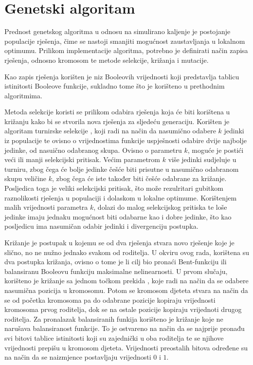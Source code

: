 \section{Genetski algoritam}
Prednost genetskog algoritma u odnosu na simulirano kaljenje je postojanje populacije rješenja, čime se nastoji smanjiti mogućnost zaustavljanja u lokalnom optimumu.
Prilikom implementacije algoritma, potrebno je definirati način zapisa rješenja, odnosno kromosom te metode selekcije, križanja i mutacije.

Kao zapis rješenja korišten je niz Booleovih vrijednosti koji predstavlja tablicu istinitosti Booleove funkcije, sukladno tome što je korišteno u prethodnim algoritmima. 

Metoda selekcije koristi se prilikom odabira rješenja koja će biti korištena u križanju kako bi se stvorila nova rješenja za sljedeću generaciju.
Korišten je algoritam turnirske selekcije \cite{PrirodomInspirirani}, koji radi na način da nasumično odabere $k$ jedinki iz populacije te ovisno o vrijednostima funkcije uspješnosti odabire dvije najbolje jedinke, od nasuično odabranog skupa.
Ovisno o parametru $k$, moguće je postići veći ili manji selekcijski pritisak.
Većim parametrom $k$ više jedinki sudjeluje u turniru, zbog čega će bolje jedinke češće biti prisutne u nasumično odabranom skupu veličine $k$, zbog čega će iste također biti češće odabrane za križanje.
Posljedica toga je veliki selekcijski pritisak, što može rezulritari gubitkom raznolikosti rješenja u populaciji i dolaskom u lokalne optimume.
Korištenjem malih vrijednosti parametra $k$, dolazi do malog selekcijskog pritiska te loše jedinke imaju jednaku mogućnost biti odabarne kao i dobre jedinke, što kao posljedicu ima nasumičan odabir jedinki i divergenciju postupka.

Križanje je postupak u kojemu se od dva rješenja stvara novo rješenje koje je slično, no ne nužno jednako svakom od roditelja.
U okviru ovog rada, korištena su dva postupka križanja, ovisno o tome je li cilj bio pronaći Bent-funkciju ili balansiranu Booleovu funkciju maksimalne nelinearnosti.
U prvom slučaju, korišteno je križanje sa jednom točkom prekida \cite{PrirodomInspirirani}, koje radi na način da se odabere nasumična pozicija u kromosomu.
Potom se kromosom djeteta stvara na način da se od početka kromosoma pa do odabrane pozicije kopiraju vrijednosti kromosoma prvog roditelja, dok se na ostale pozicije kopiraju vrijednoti drugog roditelja.
Za pronalazak balansiranih funkija korišteno je križanje koje ne narušava balansiranost funkcije.
To je ostvareno na način da se najprije pronađu svi bitovi tablice istinitosti koji su zajednički u oba roditelja te se njihove vrijednosti prepišu u kromosom djeteta.
Vrijednosti preostalih bitova određene su na način da se naizmjence postavljaju vrijednosti $0$ i $1$.

